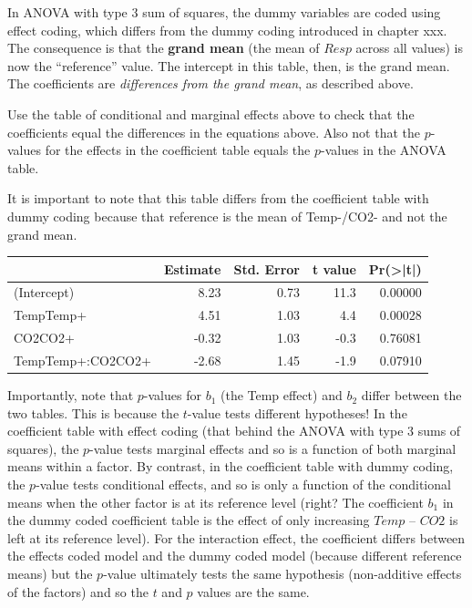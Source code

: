 \documentclass[]{book}
\begin{document}
In ANOVA with type 3 sum of squares, the dummy variables are coded using
effect coding, which differs from the dummy coding introduced in chapter
xxx. The consequence is that the \textbf{grand mean} (the mean of
\(Resp\) across all values) is now the ``reference'' value. The
intercept in this table, then, is the grand mean. The coefficients are
\emph{differences from the grand mean}, as described above.

Use the table of conditional and marginal effects above to check that
the coefficients equal the differences in the equations above. Also not
that the \(p\)-values for the effects in the coefficient table equals
the \(p\)-values in the ANOVA table.

It is important to note that this table differs from the coefficient
table with dummy coding because that reference is the mean of Temp-/CO2-
and not the grand mean.

\begin{tabular}{l|r|r|r|r}
\hline
  & Estimate & Std. Error & t value & Pr(>|t|)\\
\hline
(Intercept) & 8.23 & 0.73 & 11.3 & 0.00000\\
\hline
TempTemp+ & 4.51 & 1.03 & 4.4 & 0.00028\\
\hline
CO2CO2+ & -0.32 & 1.03 & -0.3 & 0.76081\\
\hline
TempTemp+:CO2CO2+ & -2.68 & 1.45 & -1.9 & 0.07910\\
\hline
\end{tabular}

Importantly, note that \(p\)-values for \(b_1\) (the Temp effect) and
\(b_2\) differ between the two tables. This is because the \(t\)-value
tests different hypotheses! In the coefficient table with effect coding
(that behind the ANOVA with type 3 sums of squares), the \(p\)-value
tests marginal effects and so is a function of both marginal means
within a factor. By contrast, in the coefficient table with dummy
coding, the \(p\)-value tests conditional effects, and so is only a
function of the conditional means when the other factor is at its
reference level (right? The coefficient \(b_1\) in the dummy coded
coefficient table is the effect of only increasing \(Temp\) -- \(CO2\)
is left at its reference level). For the interaction effect, the
coefficient differs between the effects coded model and the dummy coded
model (because different reference means) but the \(p\)-value ultimately
tests the same hypothesis (non-additive effects of the factors) and so
the \(t\) and \(p\) values are the same.
\end{document}
